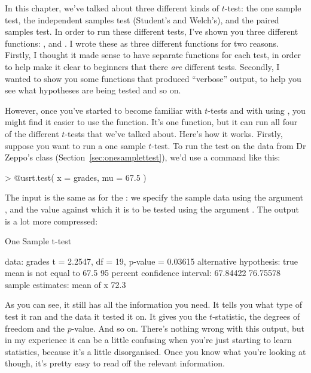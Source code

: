 In this chapter, we've talked about three different kinds of $t$-test: the one sample test, the independent samples test (Student's and Welch's), and the paired samples test. In order to run these different tests, I've shown you three different functions: ,  and . I wrote these as three different functions for two reasons. Firstly, I thought it made sense to have separate functions for each test, in order to help make it clear to beginners that there {\it are} different tests. Secondly, I wanted to show you some functions that produced ``verbose'' output, to help you see what hypotheses are being tested and so on. 

However, once you've started to become familiar with $t$-tests and with using \R, you might find it easier to use the  function. It's one function, but it can run all four of the different $t$-tests that we've talked about. Here's how it works.  Firstly, suppose you want to run a one sample $t$-test. To run the test on the  data from Dr Zeppo's class (Section~\ref{sec:onesamplettest}), we'd use a command like this:
\begin{rblock1}
> @usr{t.test( x = grades, mu = 67.5 )}
\end{rblock1}
The input is the same as for the : we specify the sample data using the argument , and the value against which it is to be tested using the argument . The output is a lot more compressed:
\begin{rblock1}
	One Sample t-test

data:  grades 
t = 2.2547, df = 19, p-value = 0.03615
alternative hypothesis: true mean is not equal to 67.5 
95 percent confidence interval:
 67.84422 76.75578 
sample estimates:
mean of x 
     72.3  
\end{rblock1}
As you can see, it still has all the information you need. It tells you what type of test it ran and the data it tested it on. It gives you the $t$-statistic, the degrees of freedom and the $p$-value. And so on. There's nothing wrong with this output, but in my experience it can be a little confusing when you're just starting to learn statistics, because it's a little disorganised. Once you know what you're looking at though, it's pretty easy to read off the relevant information. 

